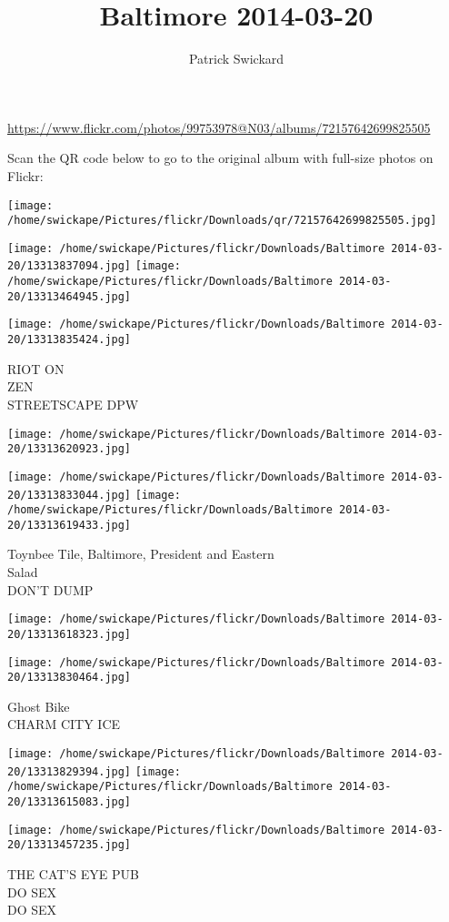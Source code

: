 \documentclass[10pt,letterpaper]{article}
\title{Baltimore 2014-03-20}
\author{Patrick Swickard}
\date{}
\begin{document}
\maketitle

\url{https://www.flickr.com/photos/99753978@N03/albums/72157642699825505}

Scan the QR code below to go to the original album with full-size photos on Flickr:

\texttt{[image: /home/swickape/Pictures/flickr/Downloads/qr/72157642699825505.jpg]}
\pagebreak

\texttt{[image: /home/swickape/Pictures/flickr/Downloads/Baltimore 2014-03-20/13313837094.jpg]}
\texttt{[image: /home/swickape/Pictures/flickr/Downloads/Baltimore 2014-03-20/13313464945.jpg]}

\vspace{0.25in}
\texttt{[image: /home/swickape/Pictures/flickr/Downloads/Baltimore 2014-03-20/13313835424.jpg]}

RIOT ON\\
ZEN\\
STREETSCAPE DPW
\pagebreak

\texttt{[image: /home/swickape/Pictures/flickr/Downloads/Baltimore 2014-03-20/13313620923.jpg]}

\vspace{0.25in}
\texttt{[image: /home/swickape/Pictures/flickr/Downloads/Baltimore 2014-03-20/13313833044.jpg]}
\texttt{[image: /home/swickape/Pictures/flickr/Downloads/Baltimore 2014-03-20/13313619433.jpg]}

Toynbee Tile, Baltimore, President and Eastern\\
Salad\\
DON'T DUMP
\pagebreak

\texttt{[image: /home/swickape/Pictures/flickr/Downloads/Baltimore 2014-03-20/13313618323.jpg]}

\vspace{0.25in}
\texttt{[image: /home/swickape/Pictures/flickr/Downloads/Baltimore 2014-03-20/13313830464.jpg]}

Ghost Bike\\
CHARM CITY ICE
\pagebreak

\texttt{[image: /home/swickape/Pictures/flickr/Downloads/Baltimore 2014-03-20/13313829394.jpg]}
\texttt{[image: /home/swickape/Pictures/flickr/Downloads/Baltimore 2014-03-20/13313615083.jpg]}

\texttt{[image: /home/swickape/Pictures/flickr/Downloads/Baltimore 2014-03-20/13313457235.jpg]}

THE CAT'S EYE PUB\\
DO SEX\\
DO SEX
\pagebreak
\end{document}
